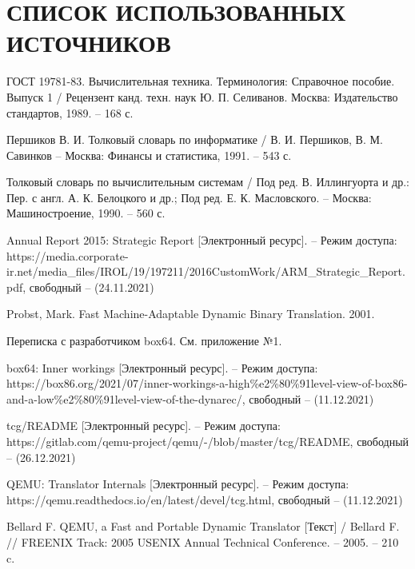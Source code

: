\section*{СПИСОК ИСПОЛЬЗОВАННЫХ ИСТОЧНИКОВ}

\begingroup
\renewcommand{\section}[2]{}
\begin{thebibliography}{}
	ГОСТ 19781-83. Вычислительная техника. Терминология: Справочное пособие. Выпуск 1 / Рецензент канд. техн. наук Ю. П. Селиванов. Москва: Издательство стандартов, 1989. -- 168 с.
		 		 
	Першиков В. И. Толковый словарь по информатике / В. И. Першиков, В. М. Савинков -- Москва: Финансы и статистика, 1991. -- 543 с.
	
	Толковый словарь по вычислительным системам / Под ред. В. Иллингуорта и др.: Пер. с англ. А. К. Белоцкого и др.; Под ред. Е. К. Масловского. -- Москва: Машиностроение, 1990. -- 560 с.
	
	Annual Report 2015: Strategic Report [Электронный ресурс]. -- Режим доступа: https://media.corporate-ir.net/media\_files/IROL/19/197211/2016CustomWork/ARM\_Strategic\_Report.pdf,
	свободный -- (24.11.2021)
	
	Probst, Mark. Fast Machine-Adaptable Dynamic Binary Translation. 2001.
	
	Переписка с разработчиком box64. См. приложение №1.
	
	box64: Inner workings [Электронный ресурс]. -- Режим доступа: https://box86.org/2021/07/inner-workings-a-high\%e2\%80\%91level-view-of-box86-and-a-low\%e2\%80\%91level-view-of-the-dynarec/,
	свободный -- (11.12.2021)
	
	tcg/README  [Электронный ресурс]. -- Режим доступа: https://gitlab.com/qemu-project/qemu/-/blob/master/tcg/README,
	свободный -- (26.12.2021)
	
	QEMU: Translator Internals [Электронный ресурс]. -- Режим доступа: https://qemu.readthedocs.io/en/latest/devel/tcg.html,
	свободный -- (11.12.2021)
	
	Bellard F. QEMU, a Fast and Portable Dynamic Translator [Текст]  / Bellard F. // FREENIX Track: 2005 USENIX Annual Technical Conference. -- 2005. -- 210 c.


\end{thebibliography}
